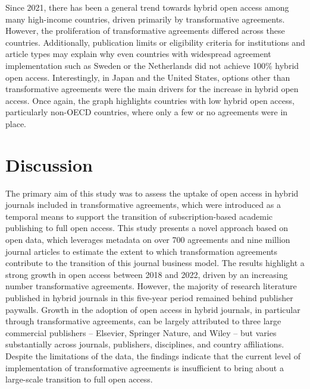 \documentclass[a4paper,man,floatsintext,longtable,noextraspace,12pt]{apa6}
\begin{document}
Since 2021, there has been a general trend towards hybrid open access
among many high-income countries, driven primarily by transformative
agreements. However, the proliferation of transformative agreements
differed across these countries. Additionally, publication limits or
eligibility criteria for institutions and article types may explain why
even countries with widespread agreement implementation such as Sweden
or the Netherlands did not achieve 100\% hybrid open access.
Interestingly, in Japan and the United States, options other than
transformative agreements were the main drivers for the increase in
hybrid open access. Once again, the graph highlights countries with low
hybrid open access, particularly non-OECD countries, where only a few or
no agreements were in place.

\hypertarget{discussion}{%
\section{Discussion}\label{discussion}}

The primary aim of this study was to assess the uptake of open access in
hybrid journals included in transformative agreements, which were
introduced as a temporal means to support the transition of
subscription-based academic publishing to full open access. This study
presents a novel approach based on open data, which leverages metadata
on over 700 agreements and nine million journal articles to estimate the
extent to which transformation agreements contribute to the transition
of this journal business model. The results highlight a strong growth in
open access between 2018 and 2022, driven by an increasing number
transformative agreements. However, the majority of research literature
published in hybrid journals in this five-year period remained behind
publisher paywalls. Growth in the adoption of open access in hybrid
journals, in particular through transformative agreements, can be
largely attributed to three large commercial publishers -- Elsevier,
Springer Nature, and Wiley -- but varies substantially across journals,
publishers, disciplines, and country affiliations. Despite the
limitations of the data, the findings indicate that the current level of
implementation of transformative agreements is insufficient to bring
about a large-scale transition to full open access.
\end{document}
